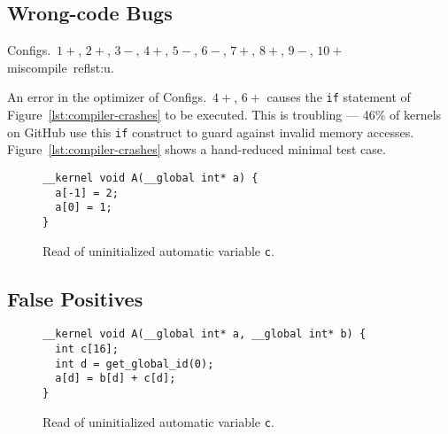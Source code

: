 

\subsection{Wrong-code Bugs}

Configs.\ $1+$, $2+$, $3-$, $4+$, $5-$, $6-$, $7+$, $8+$, $9-$, $10+$ miscompile~ref{lst:u}.

An error in the optimizer of Configs.\ $4+$, $6+$ causes the \texttt{if} statement of Figure~\ref{lst:compiler-crashes} to be executed.
This is troubling --- 46\% of kernels on GitHub use this \texttt{if} construct to guard against invalid memory accesses. Figure~\ref{lst:compiler-crashes} shows a hand-reduced minimal test case.




\begin{figure}
\begin{lstlisting}
__kernel void A(__global int* a) {
  a[-1] = 2;
  a[0] = 1;
}
\end{lstlisting}
\caption{Read of uninitialized automatic variable \texttt{c}.}
\label{lst:uninit-read}
\end{figure}


\subsection{False Positives}

\begin{figure}
\begin{lstlisting}
__kernel void A(__global int* a, __global int* b) {
  int c[16];
  int d = get_global_id(0);
  a[d] = b[d] + c[d];
}
\end{lstlisting}
\caption{Read of uninitialized automatic variable \texttt{c}.}
\label{lst:uninit-read}
\end{figure}
